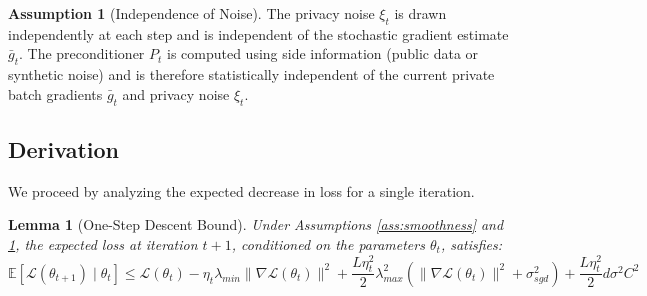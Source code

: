 \documentclass{article}
\theoremstyle{plain}
\newtheorem{lemma}[theorem]{Lemma}
\theoremstyle{definition}
\newtheorem{assumption}[theorem]{Assumption}
\theoremstyle{remark}
\begin{document}
\begin{assumption}[Independence of Noise]
\label{ass:independence}
The privacy noise $\xi_t$ is drawn independently at each step and is independent of the stochastic gradient estimate $\bar{g}_t$. The preconditioner $P_t$ is computed using side information (public data or synthetic noise) and is therefore statistically independent of the current private batch gradients $\bar{g}_t$ and privacy noise $\xi_t$.
\end{assumption}

\subsection{Derivation}


We proceed by analyzing the expected decrease in loss for a single iteration.

\begin{lemma}[One-Step Descent Bound]
\label{lemma:onestep}
Under Assumptions \ref{ass:smoothness} and \ref{ass:independence}, the expected loss at iteration $t+1$, conditioned on the parameters $\theta_t$, satisfies:
\begin{equation}
    \mathbb{E}[\mathcal{L}(\theta_{t+1}) \mid \theta_t] \le \mathcal{L}(\theta_t) - \eta_t \lambda_{min} \|\nabla \mathcal{L}(\theta_t)\|^2 + \frac{L \eta_t^2}{2} \lambda_{max}^2 \left( \|\nabla \mathcal{L}(\theta_t)\|^2 + \sigma_{sgd}^2 \right) + \frac{L \eta_t^2}{2} d \sigma^2 C^2
\end{equation}
\end{lemma}
\end{document}

